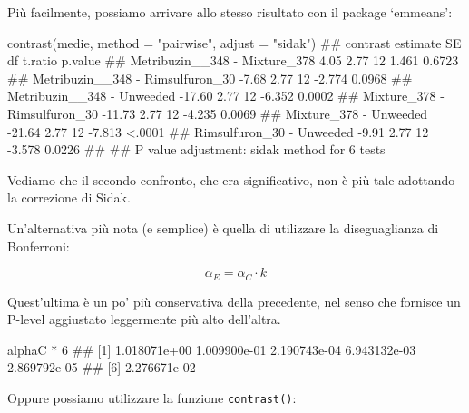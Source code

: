 \documentclass[a4paper,12pt,oneside]{book}
\newenvironment{Shaded}{\begin{snugshade}}{\end{snugshade}}
\newcommand{\DecValTok}[1]{#1}
\newcommand{\SpecialCharTok}[1]{#1}
\newcommand{\StringTok}[1]{#1}
\newcommand{\DocumentationTok}[1]{#1}
\newcommand{\FunctionTok}[1]{#1}
\newcommand{\AttributeTok}[1]{#1}
\newcommand{\NormalTok}[1]{#1}
\begin{document}
\normalsize

Più facilmente, possiamo arrivare allo stesso risultato con il package `emmeans':

\scriptsize

\begin{Shaded}
\begin{Highlighting}[]
\FunctionTok{contrast}\NormalTok{(medie, }\AttributeTok{method =} \StringTok{"pairwise"}\NormalTok{, }\AttributeTok{adjust =} \StringTok{"sidak"}\NormalTok{)}
\DocumentationTok{\#\#  contrast                         estimate   SE df t.ratio p.value}
\DocumentationTok{\#\#  Metribuzin\_\_348 {-} Mixture\_378        4.05 2.77 12   1.461  0.6723}
\DocumentationTok{\#\#  Metribuzin\_\_348 {-} Rimsulfuron\_30    {-}7.68 2.77 12  {-}2.774  0.0968}
\DocumentationTok{\#\#  Metribuzin\_\_348 {-} Unweeded         {-}17.60 2.77 12  {-}6.352  0.0002}
\DocumentationTok{\#\#  Mixture\_378 {-} Rimsulfuron\_30       {-}11.73 2.77 12  {-}4.235  0.0069}
\DocumentationTok{\#\#  Mixture\_378 {-} Unweeded             {-}21.64 2.77 12  {-}7.813  \textless{}.0001}
\DocumentationTok{\#\#  Rimsulfuron\_30 {-} Unweeded           {-}9.91 2.77 12  {-}3.578  0.0226}
\DocumentationTok{\#\# }
\DocumentationTok{\#\# P value adjustment: sidak method for 6 tests}
\end{Highlighting}
\end{Shaded}

\normalsize

Vediamo che il secondo confronto, che era significativo, non è più tale adottando la correzione di Sidak.

Un'alternativa più nota (e semplice) è quella di utilizzare la diseguaglianza di Bonferroni:

\[\alpha_E = \alpha_C \cdot k\]

Quest'ultima è un po' più conservativa della precedente, nel senso che fornisce un P-level aggiustato leggermente più alto dell'altra.

\begin{Shaded}
\begin{Highlighting}[]
\NormalTok{alphaC }\SpecialCharTok{*} \DecValTok{6}
\DocumentationTok{\#\# [1] 1.018071e+00 1.009900e{-}01 2.190743e{-}04 6.943132e{-}03 2.869792e{-}05}
\DocumentationTok{\#\# [6] 2.276671e{-}02}
\end{Highlighting}
\end{Shaded}

Oppure possiamo utilizzare la funzione \texttt{contrast()}:
\end{document}
